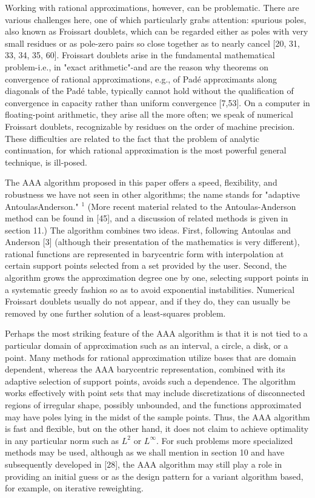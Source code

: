 \documentclass[11pt]{article}
\theoremstyle{definition}
\begin{document}
    Working with rational approximations, however, can be problematic. There are various challenges here, one of which particularly grabs attention: spurious poles, also known as Froissart doublets, which can be regarded either as poles with very small residues or as pole-zero pairs so close together as to nearly cancel [20, 31, 33, 34, 35, 60]. Froissart doublets arise in the fundamental mathematical problem-i.e., in "exact arithmetic"-and are the reason why theorems on convergence of rational approximations, e.g., of Padé approximants along diagonals of the Padé table, typically cannot hold without the qualification of convergence in capacity rather than uniform convergence [7,53]. On a computer in floating-point arithmetic, they arise all the more often; we speak of numerical Froissart doublets, recognizable by residues on the order of machine precision. These difficulties are related to the fact that the problem of analytic continuation, for which rational approximation is the most powerful general technique, is ill-posed.
    
    The AAA algorithm proposed in this paper offers a speed, flexibility, and robustness we have not seen in other algorithms; the name stands for "adaptive AntoulasAnderson." ${ }^{1}$ (More recent material related to the Antoulas-Anderson method can be found in [45], and a discussion of related methods is given in section 11.) The algorithm combines two ideas. First, following Antoulas and Anderson [3] (although their presentation of the mathematics is very different), rational functions are represented in barycentric form with interpolation at certain support points selected from a set provided by the user. Second, the algorithm grows the approximation degree one by one, selecting support points in a systematic greedy fashion so as to avoid exponential instabilities. Numerical Froissart doublets usually do not appear, and if they do, they can usually be removed by one further solution of a least-squares problem.
    
    Perhaps the most striking feature of the AAA algorithm is that it is not tied to a particular domain of approximation such as an interval, a circle, a disk, or a point. Many methods for rational approximation utilize bases that are domain dependent, whereas the AAA barycentric representation, combined with its adaptive selection of support points, avoids such a dependence. The algorithm works effectively with point sets that may include discretizations of disconnected regions of irregular shape, possibly unbounded, and the functions approximated may have poles lying in the midst of the sample points. Thus, the AAA algorithm is fast and flexible, but on the other hand, it does not claim to achieve optimality in any particular norm such as $L^{2}$ or $L^{\infty}$. For such problems more specialized methods may be used, although as we shall mention in section 10 and have subsequently developed in [28], the AAA algorithm may still play a role in providing an initial guess or as the design pattern for a variant algorithm based, for example, on iterative reweighting.\\
\end{document}
